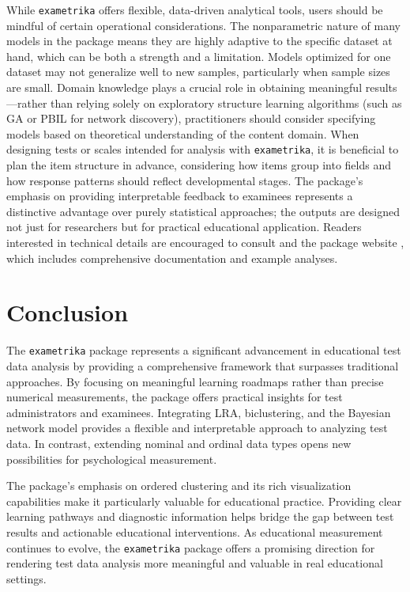 While \texttt{exametrika} offers flexible, data-driven analytical tools, users should be mindful of certain operational considerations. The nonparametric nature of many models in the package means they are highly adaptive to the specific dataset at hand, which can be both a strength and a limitation. Models optimized for one dataset may not generalize well to new samples, particularly when sample sizes are small. Domain knowledge plays a crucial role in obtaining meaningful results---rather than relying solely on exploratory structure learning algorithms (such as GA or PBIL for network discovery), practitioners should consider specifying models based on theoretical understanding of the content domain. When designing tests or scales intended for analysis with \texttt{exametrika}, it is beneficial to plan the item structure in advance, considering how items group into fields and how response patterns should reflect developmental stages. The package's emphasis on providing interpretable feedback to examinees represents a distinctive advantage over purely statistical approaches; the outputs are designed not just for researchers but for practical educational application. Readers interested in technical details are encouraged to consult \citet{shojima} and the package website \citep{kosugitti}, which includes comprehensive documentation and example analyses.

\section{Conclusion}\label{conclusion}

The \texttt{exametrika} package represents a significant advancement in educational test data analysis by providing a comprehensive framework that surpasses traditional approaches. By focusing on meaningful learning roadmaps rather than precise numerical measurements, the package offers practical insights for test administrators and examinees. Integrating LRA, biclustering, and the Bayesian network model provides a flexible and interpretable approach to analyzing test data. In contrast, extending nominal and ordinal data types opens new possibilities for psychological measurement.

The package's emphasis on ordered clustering and its rich visualization capabilities make it particularly valuable for educational practice. Providing clear learning pathways and diagnostic information helps bridge the gap between test results and actionable educational interventions. As educational measurement continues to evolve, the \texttt{exametrika} package offers a promising direction for rendering test data analysis more meaningful and valuable in real educational settings.

